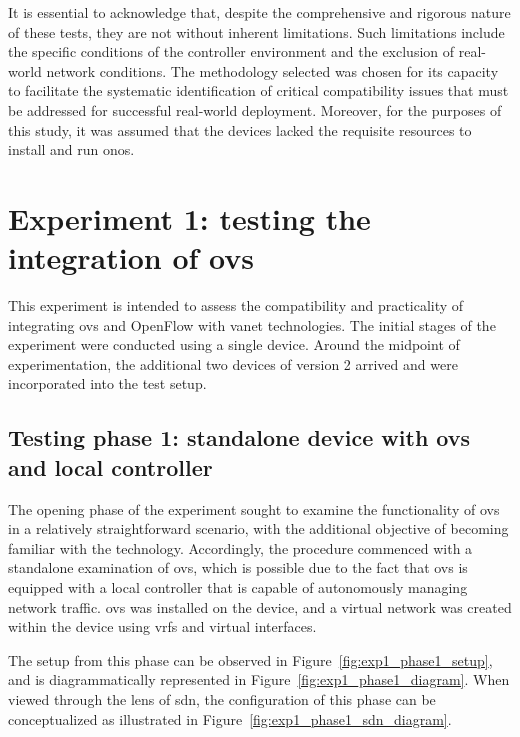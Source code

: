 It is essential to acknowledge that, despite the comprehensive and rigorous nature of these tests, they are not without inherent limitations. Such limitations include the specific conditions of the controller environment and the exclusion of real-world network conditions. The methodology selected was chosen for its capacity to facilitate the systematic identification of critical compatibility issues that must be addressed for successful real-world deployment. Moreover, for the purposes of this study, it was assumed that the devices lacked the requisite resources to install and run \gls{onos}.


\section[Experiment 1: testing the integration of OvS]{Experiment 1: testing the integration of \gls{ovs}}
This experiment is intended to assess the compatibility and practicality of integrating \gls{ovs} and OpenFlow with \gls{vanet} technologies. The initial stages of the experiment were conducted using a single device. Around the midpoint of experimentation, the additional two devices of version 2 arrived and were incorporated into the test setup.

\subsection[Testing phase 1: standalone device with OvS and local controller]{Testing phase 1: standalone device with \gls{ovs} and local controller}
The opening phase of the experiment sought to examine the functionality of \gls{ovs} in a relatively straightforward scenario, with the additional objective of becoming familiar with the technology. Accordingly, the procedure commenced with a standalone examination of \gls{ovs}, which is possible due to the fact that \gls{ovs} is equipped with a local controller that is capable of autonomously managing network traffic. \gls{ovs} was installed on the device, and a virtual network was created within the device using \glspl{vrf} and virtual interfaces.

The setup from this phase can be observed in Figure~\ref{fig:exp1_phase1_setup}, and is diagrammatically represented in Figure~\ref{fig:exp1_phase1_diagram}.
When viewed through the lens of \gls{sdn}, the configuration of this phase can be conceptualized as illustrated in Figure~\ref{fig:exp1_phase1_sdn_diagram}.

